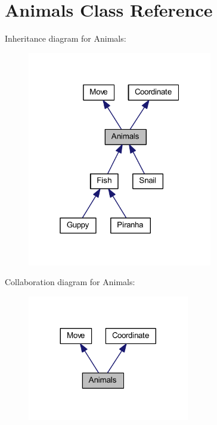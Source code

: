 \hypertarget{class_animals}{}\section{Animals Class Reference}
\label{class_animals}


Inheritance diagram for Animals\+:
\nopagebreak
\begin{figure}[H]
\begin{center}
\leavevmode
\includegraphics[width=229pt]{class_animals__inherit__graph}
\end{center}
\end{figure}


Collaboration diagram for Animals\+:
\nopagebreak
\begin{figure}[H]
\begin{center}
\leavevmode
\includegraphics[width=200pt]{class_animals__coll__graph}
\end{center}
\end{figure}
